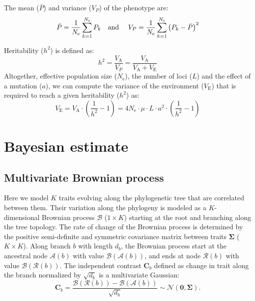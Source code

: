 \documentclass{article}
\newcommand{\Multiply}{\cdot}
\newcommand{\UniDimArray}[1]{\bm{#1}}
\newcommand{\BiDimArray}[1]{\bm{#1}}
\newcommand{\Ne}{N_{\text{e}}}
\newcommand{\Indiv}{k}
\newcommand{\Branch}{b}
\newcommand{\Trait}{P}
\newcommand{\Heritability}{h^2}
\newcommand{\VecZero}{\UniDimArray{0}}
\newcommand{\MutationRatePheno}{\mu}
\newcommand{\NbrLoci}{L}
\newcommand{\VarPhenotype}{V_{\Trait}}
\newcommand{\VarGenetic}{V_{\mathrm{A}}}
\newcommand{\VarEnv}{V_{\mathrm{E}}}
\newcommand{\Ntrait}{K}
\newcommand{\contrast}{\UniDimArray{C}}
\newcommand{\Covariancematrix}{\Sigma}
\newcommand{\CovarianceMatrix}{\BiDimArray{\Covariancematrix}}
\newcommand{\brownian}{\mathcal{B}}
\newcommand{\Brownian}{\UniDimArray{\brownian}}
\begin{document}
The mean ($\bar{\Trait}$) and variance ($\VarPhenotype$) of the phenotype are:
\begin{equation}
    \bar{\Trait} = \frac{1}{\Ne}\sum_{\Indiv=1}^{\Ne} \Trait_{\Indiv}\text{\quad and \quad} \VarPhenotype = \frac{1}{\Ne}\sum_{\Indiv=1}^{\Ne}\left(\Trait_{\Indiv} - \bar{\Trait} \right)^2 \label{eq:simu-between}
\end{equation}

Heritability ($\Heritability$) is defined as:
\begin{equation}
    \Heritability = \frac{\VarGenetic}{\VarPhenotype} = \frac{\VarGenetic}{\VarGenetic + \VarEnv}\label{eq:simu-heritability}
\end{equation}
Altogether, effective population size ($\Ne$), the number of loci ($\NbrLoci$) and the effect of a mutation ($a$), we can compute the variance of the environment ($\VarEnv$) that is required to reach a given heritability ($\Heritability$) as:
\begin{equation}
    \VarEnv = \VarGenetic \Multiply \left( \frac{1}{\Heritability} - 1 \right) = 4 \Ne \Multiply \MutationRatePheno \Multiply \NbrLoci \Multiply a^2 \Multiply \left( \frac{1}{\Heritability} - 1 \right) \label{eq:simu-var-env}
\end{equation}

\newpage
\section{Bayesian estimate}\label{sec:bayesian-estimate}

\subsection{Multivariate Brownian process}\label{subsec:multivariate-brownian-process}
Here we model $\Ntrait$ traits evolving along the phylogenetic tree that are correlated between them.
Their variation along the phylogeny is modeled as a $\Ntrait$-dimensional Brownian process $\Brownian$ ($1 \times \Ntrait$) starting at the root and branching along the tree topology.
The rate of change of the Brownian process is determined by the positive semi-definite and symmetric covariance matrix between traits $\CovarianceMatrix$ ($\Ntrait \times \Ntrait$).
Along branch $\Branch$ with length $d_{\Branch}$, the Brownian process start at the ancestral node $\mathcal{A}(\Branch)$ with value $\Brownian(\mathcal{A}(\Branch))$, and ends at node $\mathcal{R}(\Branch)$  with value $\Brownian(\mathcal{R}(\Branch))$.
The independent contrast $\contrast_{\Branch}$ defined as change in trait along the branch normalized by $\sqrt {d_{\Branch}}$ is a multivariate Gaussian:
\begin{equation}
    \label{eq:DistribBrownian}
    \contrast_{\Branch} = \frac{\Brownian (\mathcal{R}(\Branch)) - \Brownian (\mathcal{A}(\Branch)) }{\sqrt {d_{\Branch}}} \sim \mathcal{N}\left(\VecZero, \CovarianceMatrix \right).
\end{equation}
\end{document}
